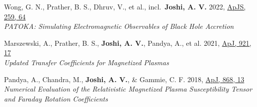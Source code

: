 \item Wong, G. N., Prather, B. S., Dhruv, V., et al., incl.\ \textbf{Joshi, A. V.} 2022, \href{https://ui.adsabs.harvard.edu/abs/2022ApJS..259...64W}{ApJS, 259, 64}\\\textit{PATOKA\@: Simulating Electromagnetic Observables of Black Hole Accretion}

\item Marszewski, A., Prather, B. S., \textbf{Joshi, A. V.}, Pandya, A., et al. 2021, \href{https://ui.adsabs.harvard.edu/abs/2021ApJ...921...17M}{ApJ, 921, 17}\\\textit{Updated Transfer Coefficients for Magnetized Plasmas}

\item Pandya, A., Chandra, M., \textbf{Joshi, A. V.}, \& Gammie, C. F. 2018, \href{https://ui.adsabs.harvard.edu/abs/2018ApJ...868...13P}{ApJ, 868, 13}\\\textit{Numerical Evaluation of the Relativistic Magnetized Plasma Susceptibility Tensor and Faraday Rotation Coefficients}

